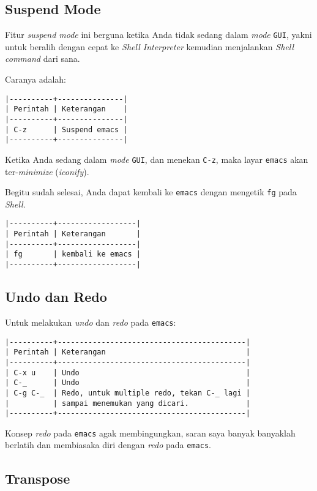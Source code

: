 \documentclass{article}
\begin{document}
\subsection{Suspend Mode}
Fitur \emph{suspend mode} ini berguna ketika Anda tidak sedang dalam 
\emph{mode} \verb=GUI=, yakni untuk beralih dengan cepat ke 
\emph{Shell Interpreter} kemudian menjalankan \emph{Shell command} dari sana.

Caranya adalah:

\begin{verbatim}
|----------+---------------|
| Perintah | Keterangan    |
|----------+---------------|
| C-z      | Suspend emacs |
|----------+---------------|
\end{verbatim}

Ketika Anda sedang dalam \emph{mode} \verb=GUI=, dan menekan \verb=C-z=, maka
layar \verb=emacs= akan ter-\emph{minimize} (\emph{iconify}).

Begitu sudah selesai, Anda dapat kembali ke \verb=emacs= dengan mengetik
\verb=fg= pada \emph{Shell}.

\begin{verbatim}
|----------+------------------|
| Perintah | Keterangan       |
|----------+------------------|
| fg       | kembali ke emacs |
|----------+------------------|
\end{verbatim}

\subsection{Undo dan Redo}
Untuk melakukan \emph{undo} dan \emph{redo} pada \verb=emacs=:

\begin{verbatim}
|----------+-------------------------------------------|
| Perintah | Keterangan                                |
|----------+-------------------------------------------|
| C-x u    | Undo                                      |
| C-_      | Undo                                      |
| C-g C-_  | Redo, untuk multiple redo, tekan C-_ lagi |
|          | sampai menemukan yang dicari.             |
|----------+-------------------------------------------|
\end{verbatim}

Konsep \emph{redo} pada \verb=emacs= agak membingungkan, saran saya banyak
banyaklah berlatih dan membiasaka diri dengan \emph{redo} pada \verb=emacs=.

\subsection{Transpose}
\end{document}
